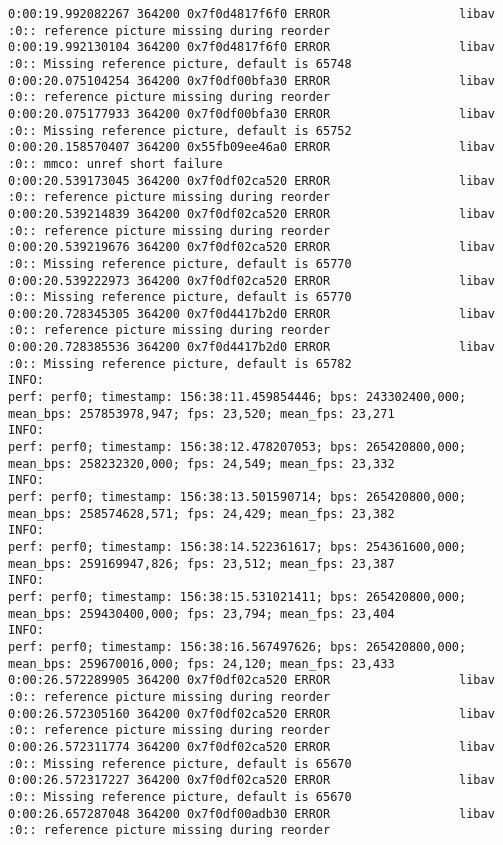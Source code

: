\documentclass[12pt,oneside]{book}
\begin{document}
\begin{lstlisting}
0:00:19.992082267 364200 0x7f0d4817f6f0 ERROR                  libav :0:: reference picture missing during reorder
0:00:19.992130104 364200 0x7f0d4817f6f0 ERROR                  libav :0:: Missing reference picture, default is 65748
0:00:20.075104254 364200 0x7f0df00bfa30 ERROR                  libav :0:: reference picture missing during reorder
0:00:20.075177933 364200 0x7f0df00bfa30 ERROR                  libav :0:: Missing reference picture, default is 65752
0:00:20.158570407 364200 0x55fb09ee46a0 ERROR                  libav :0:: mmco: unref short failure
0:00:20.539173045 364200 0x7f0df02ca520 ERROR                  libav :0:: reference picture missing during reorder
0:00:20.539214839 364200 0x7f0df02ca520 ERROR                  libav :0:: reference picture missing during reorder
0:00:20.539219676 364200 0x7f0df02ca520 ERROR                  libav :0:: Missing reference picture, default is 65770
0:00:20.539222973 364200 0x7f0df02ca520 ERROR                  libav :0:: Missing reference picture, default is 65770
0:00:20.728345305 364200 0x7f0d4417b2d0 ERROR                  libav :0:: reference picture missing during reorder
0:00:20.728385536 364200 0x7f0d4417b2d0 ERROR                  libav :0:: Missing reference picture, default is 65782
INFO:
perf: perf0; timestamp: 156:38:11.459854446; bps: 243302400,000; mean_bps: 257853978,947; fps: 23,520; mean_fps: 23,271
INFO:
perf: perf0; timestamp: 156:38:12.478207053; bps: 265420800,000; mean_bps: 258232320,000; fps: 24,549; mean_fps: 23,332
INFO:
perf: perf0; timestamp: 156:38:13.501590714; bps: 265420800,000; mean_bps: 258574628,571; fps: 24,429; mean_fps: 23,382
INFO:
perf: perf0; timestamp: 156:38:14.522361617; bps: 254361600,000; mean_bps: 259169947,826; fps: 23,512; mean_fps: 23,387
INFO:
perf: perf0; timestamp: 156:38:15.531021411; bps: 265420800,000; mean_bps: 259430400,000; fps: 23,794; mean_fps: 23,404
INFO:
perf: perf0; timestamp: 156:38:16.567497626; bps: 265420800,000; mean_bps: 259670016,000; fps: 24,120; mean_fps: 23,433
0:00:26.572289905 364200 0x7f0df02ca520 ERROR                  libav :0:: reference picture missing during reorder
0:00:26.572305160 364200 0x7f0df02ca520 ERROR                  libav :0:: reference picture missing during reorder
0:00:26.572311774 364200 0x7f0df02ca520 ERROR                  libav :0:: Missing reference picture, default is 65670
0:00:26.572317227 364200 0x7f0df02ca520 ERROR                  libav :0:: Missing reference picture, default is 65670
0:00:26.657287048 364200 0x7f0df00adb30 ERROR                  libav :0:: reference picture missing during reorder

\end{lstlisting}
\end{document}
